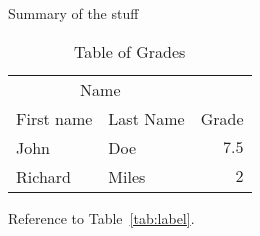 Summary of the stuff

\begin{table}[hbt]
    \caption{Table of Grades}
    \centering
    \begin{tabular}{llr}
    \toprule
    \multicolumn{2}{c}{Name} \\
    \cmidrule(r){1-2}
    First name & Last Name & Grade \\
    \midrule
    John & Doe & $7.5$ \\
    Richard & Miles & $2$ \\
    \bottomrule
    \end{tabular}
    \label{tab:label}
    \end{table}
    
    Reference to Table~\vref{tab:label}. %
    
    